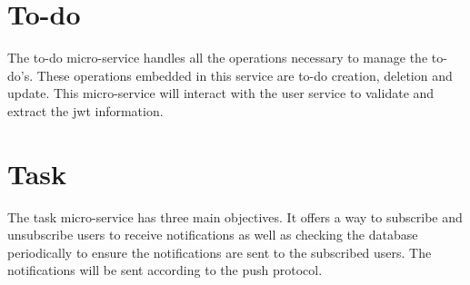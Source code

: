 	\section{To-do}
	The to-do micro-service handles all the operations necessary to manage the to-do's. These operations embedded in this service are to-do creation, deletion and update.
	This micro-service will interact with the user service to validate and extract the \gls{jwt} information.
	
	\section{Task}
	The task micro-service has three main objectives. It offers a way to subscribe and unsubscribe users to receive notifications as well as checking the database periodically to ensure the notifications are sent to the subscribed users. The notifications will be sent according to the push protocol\cite{pushprotocol}.
	 